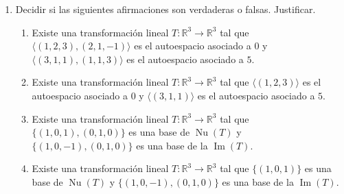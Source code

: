 \begin{enumerate}[topsep=6pt, itemsep=.4cm]
\item Decidir si las siguientes afirmaciones son verdaderas o falsas. Justificar. 
\begin{enumerate}
    \item\label{tl-V-o-F-a} Existe una transformación lineal $T:\mathbb{R}^3\longrightarrow\mathbb{R}^3$ tal que $\langle(1,2,3),(2,1,-1)\rangle$ es el autoespacio asociado a $0$ y $\langle(3,1,1),(1,1,3)\rangle$ es el autoespacio asociado a $5$.
    \item\label{tl-V-o-F-b} Existe una transformación lineal $T:\mathbb{R}^3\longrightarrow\mathbb{R}^3$ tal que $\langle(1,2,3)\rangle$ es el autoespacio asociado a $0$ y $\langle(3,1,1)\rangle$ es el autoespacio asociado a $5$.
    \item\label{tl-V-o-F-c} Existe una transformación lineal $T:\mathbb{R}^3\longrightarrow\mathbb{R}^3$ tal que $\{(1,0,1), (0,1,0)\}$ es una base de $\operatorname{Nu}(T)$ y  $\{(1,0,-1), (0,1,0)\}$ es una base de la $\operatorname{Im}(T)$.
    \item\label{tl-V-o-F-d} Existe una transformación lineal $T:\mathbb{R}^3\longrightarrow\mathbb{R}^3$ tal que $\{(1,0,1)\}$ es una base de $\operatorname{Nu}(T)$ y  $\{(1,0,-1), (0,1,0)\}$ es una base de la $\operatorname{Im}(T)$. 
\end{enumerate}

\end{enumerate}


